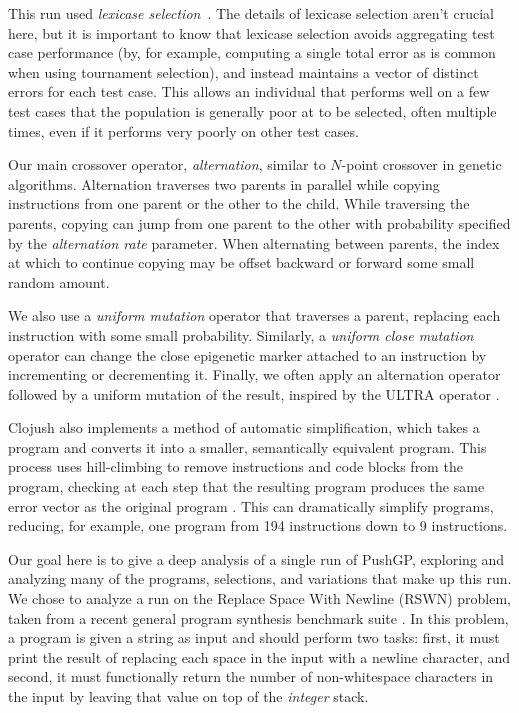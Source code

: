 \documentclass[graybox]{svmult}
\begin{document}
This run used \emph{lexicase 
	selection}~\cite{Spector:2012:GECCOcompA,Helmuth:2015:GECCO,Helmuth:2016:GECCO}. The details of lexicase selection
aren't crucial here, but it is important to know that lexicase selection
avoids aggregating test case performance (by, for example, computing a single
total error as is common when using tournament selection), and instead maintains
a vector of distinct errors for each test case. This allows an individual that 
performs well on a few test cases that the population is generally poor at to 
be selected, often multiple times, even if it performs very poorly on other 
test cases.

Our main crossover operator, \emph{alternation}, similar to $N$-point crossover in genetic algorithms.
Alternation traverses two parents in parallel while copying instructions from one parent or 
the other to the child. While traversing the parents, copying can jump from one parent to the other with probability specified by the \textit{alternation rate} parameter. When alternating between parents, the index at which to continue copying may be offset backward or forward some small random amount.

We also use a \textit{uniform mutation} operator that traverses a parent, 
replacing each instruction with some small probability. Similarly, a 
\textit{uniform close mutation} operator can change the close epigenetic marker 
attached to an instruction by incrementing or decrementing it. Finally, we 
often apply an alternation operator followed by a uniform mutation of the 
result, inspired by the ULTRA operator \cite{Spector:2013:GPTP}.

Clojush also implements a method of automatic simplification, which takes a program and 
converts it into a smaller, semantically equivalent program. This process uses 
hill-climbing to remove instructions and code blocks from the program, checking 
at each step that the resulting program produces the same error vector as the 
original program \cite{Spector:2014:GECCOcomp}. This can dramatically simplify programs, reducing, for example, one program from 194 instructions down to 9 instructions.

Our goal here is to give a deep analysis of a single run of PushGP, exploring and analyzing many of the programs, selections, and variations that make up this run. We chose to analyze a run on the Replace Space With Newline (RSWN) problem, taken from a recent general program synthesis benchmark suite \cite{Helmuth:2015:GECCO}. In this problem, a program is given a string as input and should perform two tasks: first, it must print the result of replacing each space in the input with a newline character, and second, it must functionally return the number of non-whitespace characters in the input by leaving that value on top of the \emph{integer} stack. 
\end{document}
